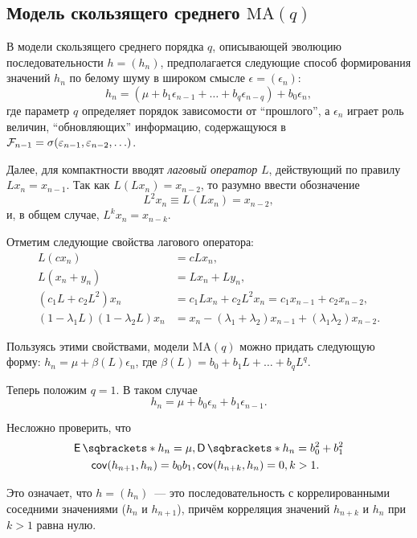 \subsection{Модель скользящего среднего \(\mathrm{MA}(q)\)}

В модели скользящего среднего порядка \(q\), описывающей эволюцию 
последовательности \(h = (h_{n})\), предполагается следующие способ 
формирования значений \(h_{n}\) по белому шуму в широком смысле \(\epsilon = 
(\epsilon_{n})\):
\[
	h_{n} = (\mu + b_{1}\epsilon_{n - 1} + \ldots + b_{q}\epsilon_{n - q}) + 
	b_{0}\epsilon_{n},
\]
где параметр \(q\) определяет порядок зависомости от ``прошлого'', а 
\(\epsilon_{n}\) играет роль величин, ``обновляющих'' информацию, содержащуюся 
в \(\mathcal{F}_{n - 1} = \sigma(\varepsilon_{n - 1}, \varepsilon_{n - 2}, \ldots)\).

Далее, для компактности вводят \emph{лаговый оператор} \(L\), действующий по 
правилу \(Lx_{n} = x_{n - 1}\). Так как \(L(Lx_{n}) = x_{n - 2}\), то разумно 
ввести обозначение
\[
	L^{2}x_{n} \equiv L(Lx_{n}) = x_{n - 2},
\]
и, в общем случае, \(L^{k}x_{n} = x_{n - k}\).

Отметим следующие свойства лагового оператора:
\begin{align*}
	L(cx_{n}) &= cLx_{n}, \\
	L(x_{n} + y_{n}) &= Lx_{n} + Ly_{n}, \\
	(c_{1}L + c_{2}L^{2})x_{n} &= c_{1}Lx_{n} + c_{2}L^{2}x_{n} = c_{1}x_{n - 
	1} + c_{2}x_{n - 2}, \\
	(1 - \lambda_{1}L)(1 - \lambda_{2}L)x_{n} &= x_{n} - (\lambda_{1} + 
	\lambda_{2})x_{n - 1} + (\lambda_{1}\lambda_{2})x_{n - 2}.
\end{align*}

Пользуясь этими свойствами, модели \(\mathrm{MA}(q)\) можно придать следующую 
форму: \(h_{n} = \mu + \beta(L)\epsilon_{n}\), где \(\beta(L) = b_{0} + b_{1}L 
+ \ldots + b_{q}L^{q}\).

Теперь положим \(q = 1\). В таком случае
\[
	h_{n} = \mu + b_{0}\epsilon_{n} + b_{1}\epsilon_{n - 1}.
\]

Несложно проверить, что
\begin{align*}
	\E{h_{n}} = \mu,& \D{h_{n}} = b_{0}^{2} + b_{1}^{2} \\
	\cov(h_{n + 1}, h_{n}) = b_{0}b_{1}, & \cov(h_{n + k}, h_{n}) = 0, k > 1.
\end{align*}

Это означает, что \(h = (h_{n})\)~--- это последовательность с коррелированными 
соседними значениями (\(h_{n}\) и \(h_{n + 1}\)), причём корреляция значений 
\(h_{n + k}\) и \(h_{n}\) при \(k > 1\) равна нулю.

